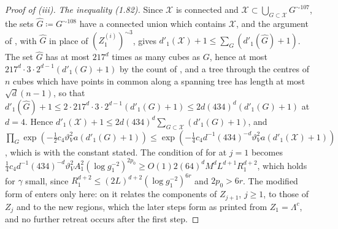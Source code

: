 \documentclass[11pt]{preprint}
\numberwithin{equation}{section}
\theoremstyle{definition}
\theoremstyle{remark}
\theoremstyle{plain}
\begin{document}
\begin{proof}[Proof of (iii)]
\emph{The inequality (1.82).} Since $\mathcal X$ is connected and $\mathcal X \subset \bigcup_{G \subset \mathcal X}G^{\sim107}$, the sets $\hat G \coloneqq G^{\sim108}$ have a connected union which contains $\mathcal X$, and the argument of \cite[p.~385]{BalabanLFR2}, with $\hat G$ in place of $(Z_1^{(i)})^{\sim3}$, gives $d'_1(\mathcal X) + 1 \leq \sum_G(d'_1(\hat G) + 1)$. The set $\hat G$ has at most $217^d$ times as many cubes as $G$, hence at most $217^d \cdot 3 \cdot 2^{d-1}(d'_1(G) + 1)$ by the count of \cite[p.~384]{BalabanLFR2}, and a tree through the centres of $n$ cubes which have points in common along a spanning tree has length at most $\sqrt d(n - 1)$, so that $d'_1(\hat G) + 1 \leq 2 \cdot 217^d \cdot 3 \cdot 2^{d-1}(d'_1(G) + 1) \leq 2d(434)^d(d'_1(G) + 1)$ at $d = 4$. Hence $d'_1(\mathcal X) + 1 \leq 2d(434)^d\sum_{G \subset \mathcal X}(d'_1(G) + 1)$, and $\prod_G\exp(-\frac12c_4\vartheta_V^2a(d'_1(G) + 1)) \leq \exp(-\frac14c_4d^{-1}(434)^{-d}\vartheta_V^2a(d'_1(\mathcal X) + 1))$, which is \cite[(1.82)]{BalabanLFR2} with the constant stated. The condition of \cite[p.~385]{BalabanLFR2} for \cite[(1.80)]{BalabanLFR2} at $j = 1$ becomes $\frac14c_4d^{-1}(434)^{-d}\vartheta_V^2A_1^2(\log g_1^{-2})^{2p_0} \geq O(1)2(64)^dM^dL^{d+1}R_1^{d+2}$, which holds for $\gamma$ small, since $R_1^{d+2} \leq (2L)^{d+2}(\log g_1^{-2})^{6r}$ and $2p_0 > 6r$. The modified form of \cite[(1.76)]{BalabanLFR2} enters only here: on \cite[p.~386]{BalabanLFR2} it relates the components of $Z_{j+1}$, $j \geq 1$, to those of $Z_j$ and to the new regions, which the later steps form as printed from $Z_1 = \Lambda^c$, and no further retreat occurs after the first step.
\end{proof}
\end{document}
